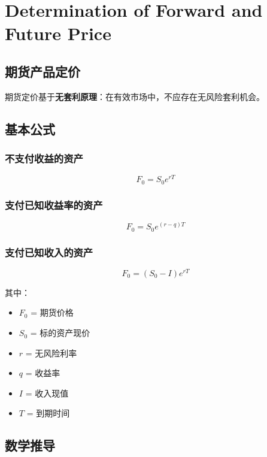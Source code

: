 \chapter{Determination of Forward and Future Price}


\section{期货产品定价}

期货定价基于\textbf{无套利原理}：在有效市场中，不应存在无风险套利机会。

\section{基本公式}

\subsection{不支付收益的资产}
\begin{equation}
F_0 = S_0 e^{rT}
\end{equation}

\subsection{支付已知收益率的资产}
\begin{equation}
F_0 = S_0 e^{(r-q)T}
\end{equation}

\subsection{支付已知收入的资产}
\begin{equation}
F_0 = (S_0 - I)e^{rT}
\end{equation}

其中：
\begin{itemize}
\item $F_0$ = 期货价格
\item $S_0$ = 标的资产现价
\item $r$ = 无风险利率
\item $q$ = 收益率
\item $I$ = 收入现值
\item $T$ = 到期时间
\end{itemize}

\section{数学推导}

